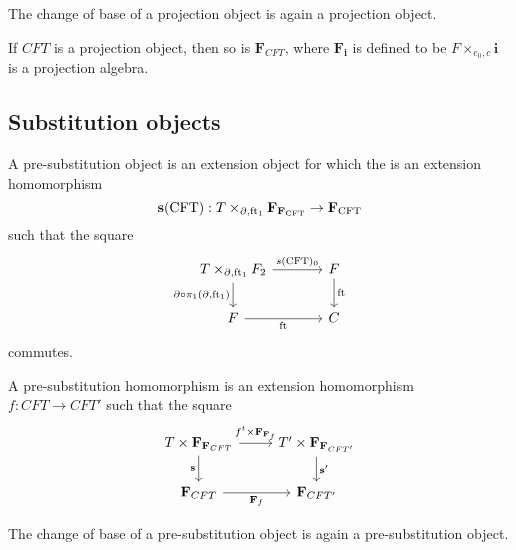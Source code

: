 \begin{cor}
The change of base of a projection object is again a projection object.
\end{cor}

\begin{cor}
If $CFT$ is a projection object, then so is $\mathbf{F}_{CFT}$, where
$\mathbf{F}_{\mathbf{i}}$ is defined to be $F\times_{e_0,c}\mathbf{i}$ is
a projection algebra.
\end{cor}

\subsection{Substitution objects}

\begin{defn}
A pre-substitution object is an extension object for which the is an
extension homomorphism
\begin{equation*}
\mathbf{s}(\stesys):\cobesys{\stesyst}{\famesys{\famesys{\stesys}}}{\ebd}{\eft[1]}\to \famesys{\stesys}
\end{equation*}
such that the square
\begin{equation*}
\begin{tikzcd}[column sep=large]
\pullback{\stesyst}{\stesysf_2}{\ebd}{\eft[1]}
  \ar{r}{s(\stesys)_0}
  \ar{d}[swap]{\ebd\circ\pullbackpr{1}{\ebd}{\eft[1]}}
  &
\stesysf 
  \ar{d}{\eft}
  \\
\stesysf 
  \ar{r}[swap]{\eft}
  &
\stesysc
\end{tikzcd}
\end{equation*}
commutes.
\end{defn}

\begin{defn}
A pre-substitution homomorphism is an extension homomorphism $f:CFT\to CFT'$
such that the square
\begin{equation*}
\begin{tikzcd}
T\times\mathbf{F}_{\mathbf{F}_{CFT}}
  \ar{r}{f^t\times\mathbf{F}_{\mathbf{F}_f}}
  \ar{d}[swap]{\mathbf{s}}
  &
T'\times\mathbf{F}_{\mathbf{F}_{CFT'}}
  \ar{d}{\mathbf{s}'}
  \\
\mathbf{F}_{CFT}
  \ar{r}[swap]{\mathbf{F}_f}
  &
\mathbf{F}_{CFT'}
\end{tikzcd}
\end{equation*}
\end{defn}

\begin{lem}
The change of base of a pre-substitution object is again a pre-substitution object.
\end{lem}


